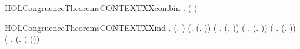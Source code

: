\newcommand{\HOLCongruenceTheoremsCONTEXTXXcases}{\UseVerbatim{HOLCongruenceTheoremsCONTEXTXXcases}}
\begin{SaveVerbatim}{HOLCongruenceTheoremsCONTEXTXXcombin}
\HOLTokenTurnstile{} \HOLSymConst{\HOLTokenForall{}} .   \HOLSymConst{\HOLTokenConj{}}   \HOLSymConst{\HOLTokenImp{}}  ( \HOLConst{\HOLTokenCompose} )
\end{SaveVerbatim}
\newcommand{\HOLCongruenceTheoremsCONTEXTXXcombin}{\UseVerbatim{HOLCongruenceTheoremsCONTEXTXXcombin}}
\begin{SaveVerbatim}{HOLCongruenceTheoremsCONTEXTXXind}
\HOLTokenTurnstile{} \HOLSymConst{\HOLTokenForall{}}.
        (\HOLTokenLambda{}. ) \HOLSymConst{\HOLTokenConj{}} (\HOLSymConst{\HOLTokenForall{}}.  (\HOLTokenLambda{}. )) \HOLSymConst{\HOLTokenConj{}}
       (\HOLSymConst{\HOLTokenForall{}} .   \HOLSymConst{\HOLTokenImp{}}  (\HOLTokenLambda{}.  )) \HOLSymConst{\HOLTokenConj{}}
       (\HOLSymConst{\HOLTokenForall{}} .
              \HOLSymConst{\HOLTokenConj{}}   \HOLSymConst{\HOLTokenImp{}}
             (\HOLTokenLambda{}.   \HOLSymConst{+}  )) \HOLSymConst{\HOLTokenConj{}}
       (\HOLSymConst{\HOLTokenForall{}} .
              \HOLSymConst{\HOLTokenConj{}}   \HOLSymConst{\HOLTokenImp{}}
             (\HOLTokenLambda{}.   \HOLSymConst{\ensuremath{\parallel}}  )) \HOLSymConst{\HOLTokenConj{}}
       (\HOLSymConst{\HOLTokenForall{}} .   \HOLSymConst{\HOLTokenImp{}}  (\HOLTokenLambda{}. \HOLConst{\ensuremath{\nu}}  ( ))) \HOLSymConst{\HOLTokenConj{}}

\end{SaveVerbatim}
